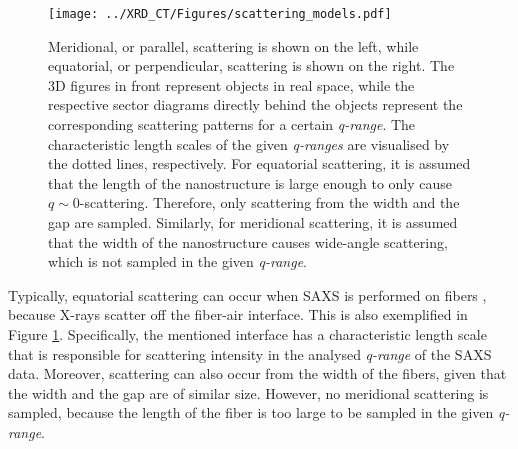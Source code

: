 \begin{figure}

    \centering
    \texttt{[image: ../XRD\_CT/Figures/scattering\_models.pdf]}
    \caption[Meridional and Equatorial Scattering]{Meridional, or parallel, scattering is shown on the left, while equatorial, or perpendicular, scattering is shown on the right.
        The 3D figures in front represent objects in real space, while the respective sector diagrams directly behind the objects represent the corresponding scattering patterns for a certain \emph{q-range}.
        The characteristic length scales of the given \emph{q-ranges} are visualised by the dotted lines, respectively.
        For equatorial scattering, it is assumed that the length of the nanostructure is large enough to only cause $q\sim0$-scattering.
        Therefore, only scattering from the width and the gap are sampled.
        Similarly, for meridional scattering, it is assumed that the width of the nanostructure causes wide-angle scattering, which is not sampled in the given \emph{q-range}.
    }
    \label{fig:scattering_models}
\end{figure}

Typically, equatorial scattering can occur when SAXS is performed on fibers \cite{li2013quantitative}, because X-rays scatter off the fiber-air interface.
This is also exemplified in Figure \ref{fig:scattering_models}.
Specifically, the mentioned interface has a characteristic length scale that is responsible for scattering intensity in the analysed \emph{q-range} of the SAXS data.
Moreover, scattering can also occur from the width of the fibers, given that the width and the gap are of similar size.
However, no meridional scattering is sampled, because the length of the fiber is too large to be sampled in the given \emph{q-range}.


